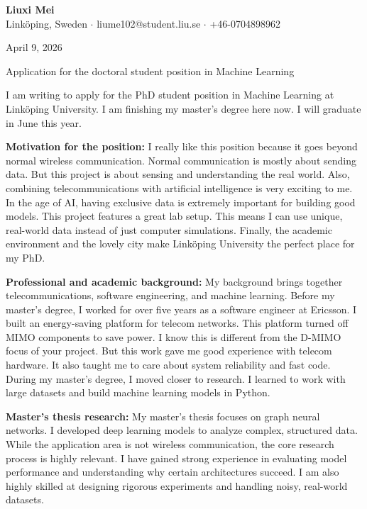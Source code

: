 \documentclass[11pt,a4paper]{article}
\begin{document}
\begin{center}
    {\LARGE \textbf{Liuxi Mei}} \\
    \vspace{2mm}
    Linköping, Sweden $\cdot$ liume102@student.liu.se $\cdot$ +46-0704898962
    \vspace{4mm}
\end{center}

\begin{flushright}
April 9, 2026
\end{flushright}

Application for the doctoral student position in Machine Learning


I am writing to apply for the PhD student position in Machine Learning at Linköping University. I am finishing my master's degree here now. I will graduate in June this year.

\textbf{Motivation for the position:} I really like this position because it goes beyond normal wireless communication. Normal communication is mostly about sending data. But this project is about sensing and understanding the real world. Also, combining telecommunications with artificial intelligence is very exciting to me. In the age of AI, having exclusive data is extremely important for building good models. This project features a great lab setup. This means I can use unique, real-world data instead of just computer simulations. Finally, the academic environment and the lovely city make Linköping University the perfect place for my PhD.

\textbf{Professional and academic background:} My background brings together telecommunications, software engineering, and machine learning. Before my master's degree, I worked for over five years as a software engineer at Ericsson. I built an energy-saving platform for telecom networks. This platform turned off MIMO components to save power. I know this is different from the D-MIMO focus of your project. But this work gave me good experience with telecom hardware. It also taught me to care about system reliability and fast code. During my master's degree, I moved closer to research. I learned to work with large datasets and build machine learning models in Python.

\textbf{Master's thesis research:} My master's thesis focuses on graph neural networks. I developed deep learning models to analyze complex, structured data. While the application area is not wireless communication, the core research process is highly relevant. I have gained strong experience in evaluating model performance and understanding why certain architectures succeed. I am also highly skilled at designing rigorous experiments and handling noisy, real-world datasets.
\end{document}
